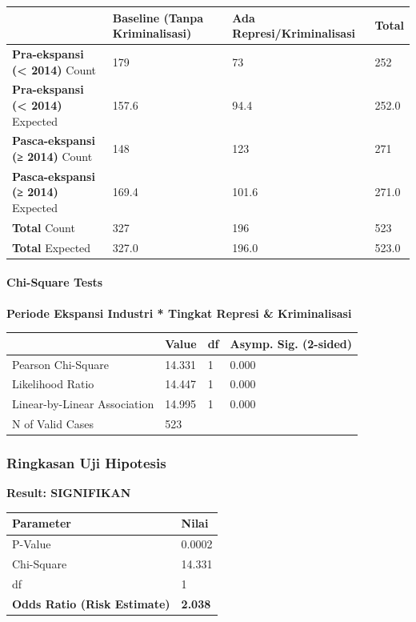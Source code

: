 \documentclass[
]{article}
\newcounter{none} %
\begin{document}
{\def\LTcaptype{none} %
\begin{longtable}[]{@{}llll@{}}
\toprule\noalign{}
& Baseline (Tanpa Kriminalisasi) & Ada Represi/Kriminalisasi & Total \\
\midrule\noalign{}
\endhead
\bottomrule\noalign{}
\endlastfoot
\textbf{Pra-ekspansi (\textless{} 2014)} Count & 179 & 73 & 252 \\
\textbf{Pra-ekspansi (\textless{} 2014)} Expected & 157.6 & 94.4 &
252.0 \\
\textbf{Pasca-ekspansi (≥ 2014)} Count & 148 & 123 & 271 \\
\textbf{Pasca-ekspansi (≥ 2014)} Expected & 169.4 & 101.6 & 271.0 \\
\textbf{Total} Count & 327 & 196 & 523 \\
\textbf{Total} Expected & 327.0 & 196.0 & 523.0 \\
\end{longtable}
}

\paragraph{Chi-Square Tests}\label{chi-square-tests}

\textbf{Periode Ekspansi Industri * Tingkat Represi \& Kriminalisasi}

{\def\LTcaptype{none} %
\begin{longtable}[]{@{}llll@{}}
\toprule\noalign{}
& Value & df & Asymp. Sig. (2-sided) \\
\midrule\noalign{}
\endhead
\bottomrule\noalign{}
\endlastfoot
Pearson Chi-Square & 14.331 & 1 & 0.000 \\
Likelihood Ratio & 14.447 & 1 & 0.000 \\
Linear-by-Linear Association & 14.995 & 1 & 0.000 \\
N of Valid Cases & 523 & & \\
\end{longtable}
}

\subsubsection{Ringkasan Uji Hipotesis}\label{ringkasan-uji-hipotesis}

\textbf{Result: SIGNIFIKAN}

{\def\LTcaptype{none} %
\begin{longtable}[]{@{}ll@{}}
\toprule\noalign{}
Parameter & Nilai \\
\midrule\noalign{}
\endhead
\bottomrule\noalign{}
\endlastfoot
P-Value & 0.0002 \\
Chi-Square & 14.331 \\
df & 1 \\
\textbf{Odds Ratio (Risk Estimate)} & \textbf{2.038} \\
\end{longtable}
}
\end{document}
